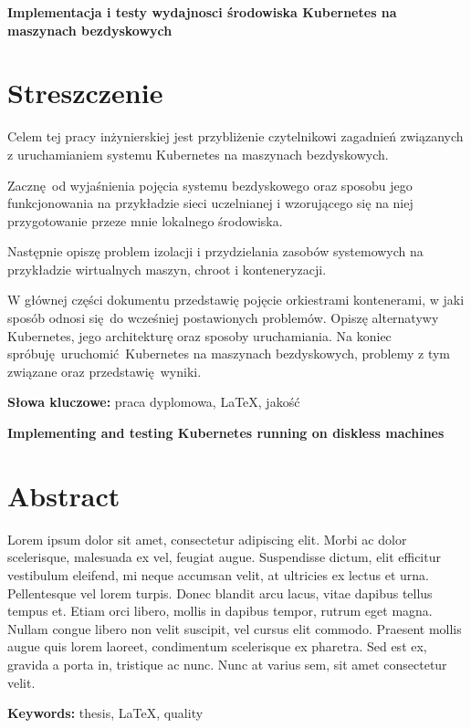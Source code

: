 \newpage
\begin{center}
  \large \bf
  Implementacja i testy wydajnosci środowiska Kubernetes na maszynach bezdyskowych
\end{center}

\section*{Streszczenie}

Celem tej pracy inżynierskiej jest przybliżenie czytelnikowi zagadnień
związanych z uruchamianiem systemu Kubernetes na maszynach bezdyskowych.

Zacznę od wyjaśnienia pojęcia systemu bezdyskowego oraz sposobu jego
funkcjonowania na przykładzie sieci uczelnianej i wzorującego się na niej
przygotowanie przeze mnie lokalnego środowiska.

Następnie opiszę problem izolacji i przydzielania zasobów systemowych
na przykładzie wirtualnych maszyn, chroot i konteneryzacji.

W głównej części dokumentu przedstawię pojęcie orkiestrami kontenerami,
w jaki sposób odnosi się do wcześniej postawionych problemów. Opiszę
alternatywy Kubernetes, jego architekturę oraz sposoby uruchamiania.
Na koniec spróbuję uruchomić Kubernetes na maszynach bezdyskowych,
problemy z tym związane oraz przedstawię wyniki.

\bigskip
{\noindent\bf Słowa kluczowe:} praca dyplomowa, LaTeX, jakość

\vskip 2cm


\begin{center}
  \large \bf
  Implementing and testing Kubernetes running on diskless machines
\end{center}

\section*{Abstract}

Lorem ipsum dolor sit amet, consectetur adipiscing elit.
Morbi ac dolor scelerisque, malesuada ex vel, feugiat augue.
Suspendisse dictum, elit efficitur vestibulum eleifend, mi neque
accumsan velit, at ultricies ex lectus et urna. Pellentesque vel
lorem turpis. Donec blandit arcu lacus, vitae dapibus tellus tempus et.
Etiam orci libero, mollis in dapibus tempor, rutrum eget magna.
Nullam congue libero non velit suscipit, vel cursus elit commodo.
Praesent mollis augue quis lorem laoreet, condimentum scelerisque ex pharetra.
Sed est ex, gravida a porta in, tristique ac nunc. Nunc at varius sem, sit amet consectetur velit.

\bigskip
{\noindent\bf Keywords:} thesis, LaTeX, quality

\vfill